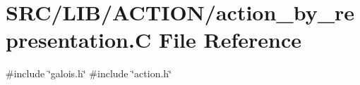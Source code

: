 \hypertarget{action__by__representation_8_c}{}\section{S\+R\+C/\+L\+I\+B/\+A\+C\+T\+I\+O\+N/action\+\_\+by\+\_\+representation.C File Reference}
\label{action__by__representation_8_c}
{\ttfamily \#include \char`\"{}galois.\+h\char`\"{}}\newline
{\ttfamily \#include \char`\"{}action.\+h\char`\"{}}\newline
